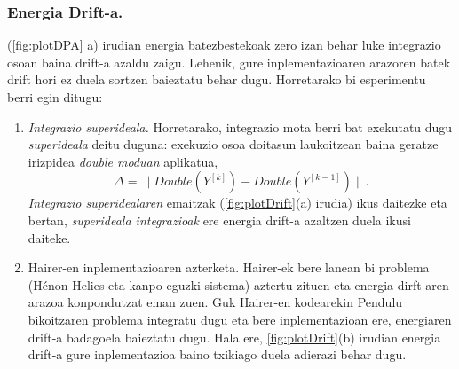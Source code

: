  



\subsubsection*{Energia Drift-a.}
\label{Drift}

(\ref{fig:plotDPA} a) irudian energia batezbestekoak zero izan behar luke integrazio osoan baina drift-a azaldu zaigu. Lehenik, gure inplementazioaren arazoren batek drift hori ez duela sortzen baieztatu behar dugu. Horretarako bi esperimentu berri egin ditugu:

\begin{enumerate}
\item \emph{Integrazio superideala.}
Horretarako, integrazio mota berri bat exekutatu dugu \emph{superideala} deitu duguna: exekuzio osoa doitasun laukoitzean baina geratze irizpidea \emph{double moduan} aplikatua,
\begin{equation*}
\Delta =\|Double(Y^{[k]})-Double(Y^{[k-1]})\|.
\end{equation*}
\emph{Integrazio superidealaren} emaitzak (\ref{fig:plotDrift}(a) irudia) ikus daitezke eta bertan, \emph{superideala integrazioak} ere energia drift-a azaltzen duela ikusi daiteke.

\item Hairer-en inplementazioaren azterketa. Hairer-ek bere lanean \cite{Hairer2008} bi problema (Hénon-Helies eta kanpo eguzki-sistema) aztertu zituen eta energia dirft-aren arazoa konpondutzat eman zuen. Guk Hairer-en kodearekin Pendulu bikoitzaren problema integratu dugu eta bere inplementazioan ere, energiaren drift-a badagoela baieztatu dugu. Hala ere,  \ref{fig:plotDrift}(b) irudian energia drift-a gure inplementazioa baino txikiago duela adierazi behar dugu.

\end{enumerate}


